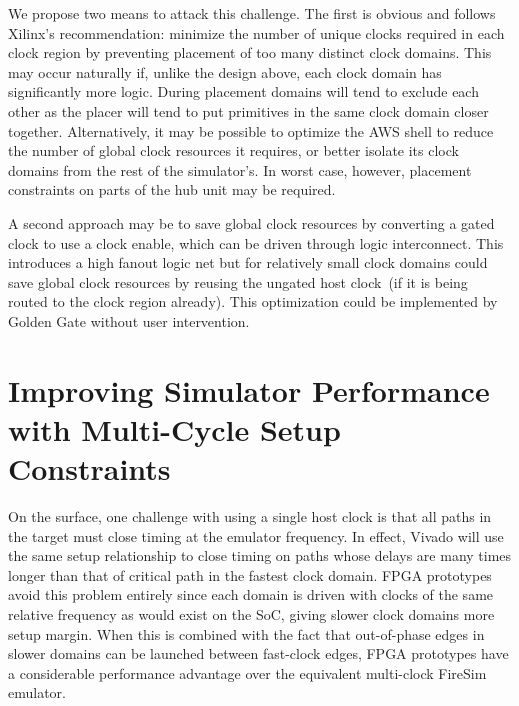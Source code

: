 We propose two means to attack this challenge. The first is obvious and follows Xilinx's recommendation:
minimize the number of unique clocks required in each clock region by
preventing placement of too many distinct clock domains. This may occur naturally
if, unlike the design above, each clock domain has significantly more logic.
During placement domains will tend to exclude each other as the placer will
tend to put primitives in the same clock domain closer together. Alternatively,
it may be possible to optimize the AWS shell to reduce the number of global
clock resources it requires, or better isolate its clock domains from the rest
of the simulator's. In worst case, however, placement constraints on parts of
the hub unit may be required.

A second approach may be to save global clock resources by converting a gated
clock to use a clock enable, which can be driven through logic interconnect.
This introduces a high fanout logic net but for relatively small clock domains could save global clock resources
by reusing the ungated host clock~(if it is being routed to the
clock region already). This optimization could be implemented by Golden Gate
without user intervention.

\section{Improving Simulator Performance with Multi-Cycle Setup Constraints}\label{sec:multi-cycle-constraints}

On the surface, one challenge with using a single host clock is that all
paths in the target must close timing at the emulator frequency.
In effect, Vivado will use the same setup relationship to close timing on paths
whose delays are many times longer than that of critical path in the fastest
clock domain. FPGA prototypes avoid this problem entirely since each
domain is driven with clocks of the same relative frequency as would exist on the SoC, giving slower clock domains
more setup margin. When this is combined with the fact that out-of-phase
edges in slower domains can be launched between fast-clock edges, FPGA
prototypes have a considerable performance advantage over the equivalent
multi-clock FireSim emulator.

